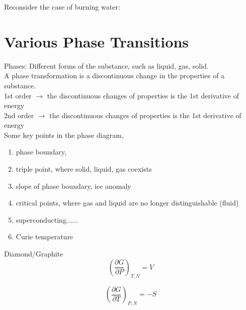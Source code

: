 Reconsider the case of burning water:~~~~~~~\\

\section{Various Phase Transitions}
Phases: Different forms of the substance, such as liquid, gas, solid.\\
A phase transformation is a discontinuous change in the properties of a substance.\\
1st order $\rightarrow$ the discontinuous changes of properties is the 1st derivative of energy\\
2nd order $\rightarrow$ the discontinuous changes of properties is the 1st derivative of energy\\
Some key points in the phase diagram,
\begin{enumerate}
\item phase boundary, 
\item triple point, where solid, liquid, gas coexists
\item slope of phase boundary, ice anomaly
\item critical points, where gas and liquid are no longer distinguishable (fluid)
\item superconducting......
\item Curie temperature
\end{enumerate}

Diamond/Graphite
\begin{equation} 
(\frac{\partial G}{\partial P})_{T,N} = V
\end{equation}

\begin{equation} 
(\frac{\partial G}{\partial T})_{P,N} = -S
\end{equation}



